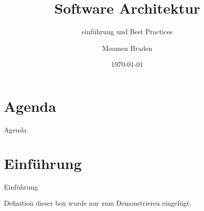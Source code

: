 \documentclass{beamer}
\title{Software Architektur}
\subtitle{einführung und Best Practices}
\author{Moamen Hraden}
\date{\today}
\begin{document}
	\begin{frame}[plain]
		\maketitle
	\end{frame}
	
	\section{Agenda}
	\begin{frame}{Agenda}
		\tableofcontents
	\end{frame}
	
	
	\section{Einführung}	
	\begin{frame}{Einführung}
		\begin{block}{Definition}
			dieser box wurde nur zum Demonstrieren eingefügt.
		\end{block}
	\end{frame}
	
\end{document}
